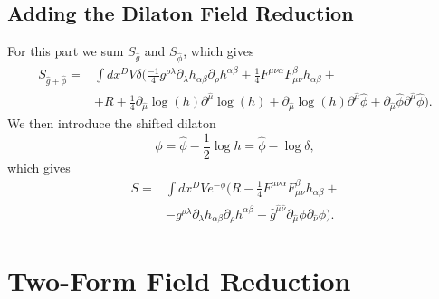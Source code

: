 \documentclass{article}
\begin{document}
\subsection{Adding the Dilaton Field Reduction}
For this part we sum $S_{\hat g}$ and $S_{\hat \phi}$, which gives
    \begin{equation*}
    \begin{aligned}
    S_{\hat g + \hat \phi} = &\int d x^D V \delta \Big( 
    \frac{-1}{4} g^{\rho \lambda} \partial_\lambda h_{\alpha \beta}\partial_\rho h^{\alpha \beta}
    +\frac{1}{4}F^{\mu \nu \alpha}F^{\beta}_{\mu  \nu}h_{\alpha \beta}+\\
    &+ R + \frac{1}{4} \partial_{\hat \mu} \log(h) \partial^{\hat \mu} \log(h) + \partial_{\hat \mu} \log(h) \partial^{\hat \mu} \hat \phi + \partial_{\hat \mu} \hat \phi \partial^{\hat \mu} \hat \phi \Big).
\end{aligned}
\end{equation*}
We then introduce the shifted dilaton
\begin{equation}
    \phi = \hat \phi -\frac{1}{2} \log{h}= \hat \phi - \log{\delta},
\end{equation}
which gives
\begin{equation}
\boxed{
    \begin{aligned}
    S = &\int d x^D V e^{- \phi}\Big(
    R -\frac{1}{4}F^{\mu \nu \alpha}F^{\beta}_{\mu  \nu}h_{\alpha \beta}+\\
    &- g^{\rho \lambda} \partial_\lambda h_{\alpha \beta}\partial_\rho h^{\alpha \beta}
    +\hat g^{\hat \mu  \hat \nu } \partial_{\hat \mu}\phi\partial_{\hat \nu}\phi\Big).
\end{aligned}}
\end{equation} 
\section{Two-Form Field Reduction}
\end{document}
